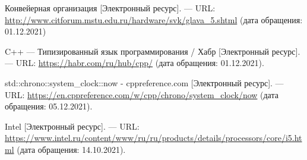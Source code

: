 
\renewcommand\bibname{Список использованных источников}
\begin{thebibliography}{}
 Конвейерная организация [Электронный ресурс]. --- URL: \url{http://www.citforum.mstu.edu.ru/hardware/svk/glava_5.shtml} (дата обращения: 01.12.2021)

C++ –– Типизированный язык программирования / Хабр [Электронный ресурс]. --- URL: \url{https://habr.com/ru/hub/cpp/} (дата обращения: 01.12.2021).

 std::chrono::system\_clock::now - cppreference.com [Электронный ресурс]. --- URL: \url{https://en.cppreference.com/w/cpp/chrono/system_clock/now} (дата обращения: 05.12.2021).

 Intel [Электронный ресурс]. --- URL: \url{https://www.intel.ru/content/www/ru/ru/products/details/processors/core/i5.html} (дата обращения: 14.10.2021).

\end{thebibliography}